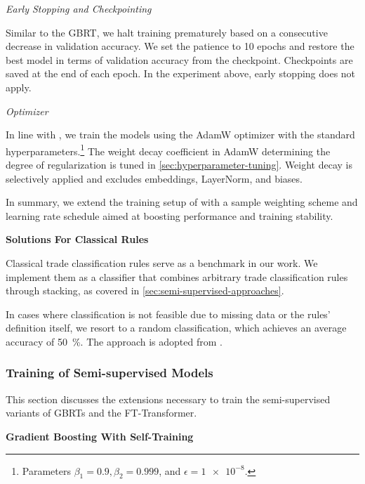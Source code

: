 \emph{Early Stopping and Checkpointing}

Similar to the \gls{GBRT}, we halt training prematurely based on a consecutive decrease in validation accuracy. We set the patience to \num{10} epochs and restore the best model in terms of validation accuracy from the checkpoint. Checkpoints are saved at the end of each epoch. In the experiment above, early stopping does not apply.

\emph{Optimizer}

In line with \textcite[\checkmark][18937]{gorishniyRevisitingDeepLearning2021}, we train the models using the AdamW optimizer \autocite[\checkmark][2--3]{loshchilovDecoupledWeightDecay2019} with the standard hyperparameters.\footnote{Parameters $\beta_{1}=0.9, \beta_{2}=0.999$, and $\epsilon = \num{1e-8}$.} The weight decay coefficient in AdamW determining the degree of regularization is tuned in \cref{sec:hyperparameter-tuning}. Weight decay is selectively applied and excludes embeddings, LayerNorm, and biases.

In summary, we extend the training setup of \textcite[\checkmark][18937]{gorishniyRevisitingDeepLearning2021} with a sample weighting scheme and learning rate schedule aimed at boosting performance and training stability.

\vskip 1.3in

\textbf{Solutions For Classical Rules}

Classical trade classification rules serve as a benchmark in our work. We implement them as a classifier that combines arbitrary trade classification rules through stacking, as covered in \cref{sec:semi-supervised-approaches}.

In cases where classification is not feasible due to missing data or the rules' definition itself, we resort to a random classification, which achieves an average accuracy of \SI{50}{\percent}. The approach is adopted from \textcite[\checkmark][887]{savickasInferringDirectionOption2003}.

\subsubsection{Training of Semi-supervised
    Models}\label{sec:training-of-semi-supervised-models}

This section discusses the extensions necessary to train the semi-supervised variants of \glspl{GBRT} and the FT-Transformer.

\textbf{Gradient Boosting With Self-Training}


